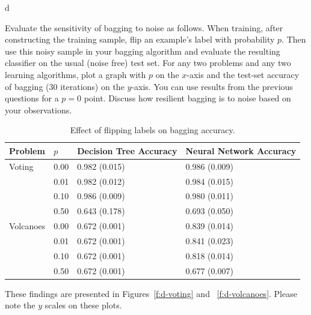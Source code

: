 \documentclass[fleqn]{homework}
\begin{document}
    \FloatBarrier
  \begin{problem}{d}
    \begin{question}
      Evaluate the sensitivity of bagging to noise as follows. When training,
      after constructing the training sample, flip an example’s label with
      probability $p$. Then use this noisy sample in your bagging algorithm and
      evaluate the resulting classifier on the usual (noise free) test set. For
      any two problems and any two learning algorithms, plot a graph with $p$ on
      the $x$-axis and the test-set accuracy of bagging (30 iterations) on the
      $y$-axis. You can use results from the previous questions for a $p=0$
      point. Discuss how resilient bagging is to noise based on your
      observations.
    \end{question}
    \FloatBarrier

    \begin{table}[h]
      \centering
      \caption{Effect of flipping labels on bagging accuracy.}
      \label{t:d}
      \begin{tabular}{ll|ll}
        \toprule
        Problem   & $p$        & Decision Tree Accuracy & Neural Network Accuracy \\
        \midrule
        Voting    & 0.00       & 0.982 (0.015)          & 0.986 (0.009)            \\
                  & 0.01       & 0.982 (0.012)          & 0.984 (0.015)            \\
                  & 0.10       & 0.986 (0.009)          & 0.980 (0.011)            \\
                  & 0.50       & 0.643 (0.178)          & 0.693 (0.050)            \\
        \midrule
        Volcanoes & 0.00       & 0.672 (0.001)          & 0.839 (0.014)            \\
                  & 0.01       & 0.672 (0.001)          & 0.841 (0.023)            \\
                  & 0.10       & 0.672 (0.001)          & 0.818 (0.014)            \\
                  & 0.50       & 0.672 (0.001)          & 0.677 (0.007)            \\
        \bottomrule
      \end{tabular}
    \end{table}

    These findings are presented in Figures~\ref{f:d-voting} and
    ~\ref{f:d-volcanoes}.  Please note the $y$ scales on these plots.


\end{problem}
\end{document}
